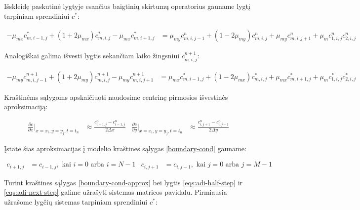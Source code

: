 Išskleidę paskutinė lygtyje esančius baigtinių skirtumų operatorius gauname lygtį tarpiniam sprendiniui $c^*$:

\begin{align}
  -\mu_{mx}c^{*}_{m,i-1,j}+(1+2\mu_{mx})c^{*}_{m,i,j}-\mu_{mx}c^{*}_{m,i+1,j}
  &= \mu_{my}c^n_{m,i,j-1}+(1-2\mu_{my})c^n_{m,i,j}+\mu_{my}c^n_{m,i,j+1}+\mu_m c^n_{1,i,j}c^n_{2,i,j}
\end{align}

Analogiškai galima išvesti lygtis sekančiam laiko žingsniui $c^{n+1}_{m,i,j}$:

\begin{align}
  -\mu_{my}c^{n+1}_{m,i,j-1}+(1+2\mu_{my})c^{n+1}_{m,i,j}-\mu_{my}c^{n+1}_{m,i,j+1}
  &= \mu_{mx}c^*_{m,i-1,j}+(1-2\mu_{mx})c^*_{m,i,j}+\mu_{mx}c^*_{m,i+1,j}+\mu_m c^*_{1,i,j}c^*_{2,i,j}
\end{align}

Kraštinėms sąlygoms apskaičiuoti naudosime centrinę pirmosios išvestinės aproksimaciją:

\begin{align*}
  \frac{\partial c}{\partial x}\Big|_{x=x_i, y=y_j, t=t_n} 
  &\approx \frac{c^n_{i+1,j}-c^n_{i-1,j}}{2\Delta x} &
  \frac{\partial c}{\partial y}\Big|_{x=x_i, y=y_j, t=t_n} 
  &\approx \frac{c^n_{i,j+1}-c^n_{i,j-1}}{2\Delta y}
\end{align*}

Įstate šias aproksimacijas į modelio kraštines sąlygas \eqref{boundary-cond} gauname:

\begin{subequations} \label{boundary-cond-approx}
\begin{align} 
  c_{i+1,j} &= c_{i-1,j}, \text{ kai } i = 0 \text{ arba } i = N-1 &
  c_{i,j+1} &= c_{i,j-1}, \text{ kai } j = 0 \text{ arba } j = M-1 &
\end{align}
\end{subequations}

Turint kraštines sąlygas \eqref{boundary-cond-approx} bei lygtis \eqref{eqs:adi-half-step} ir \eqref{eqs:adi-next-step} galime užrašyti sistemas matricos pavidalu. Pirmiausia užrašome lygčių sistemas tarpiniam sprendiniui $c^*$:

